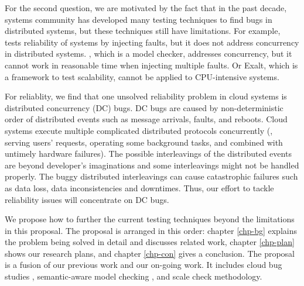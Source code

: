 For the second question, we are motivated by the fact that in the past decade,
systems community has developed many testing techniques
\cite{Gunawi+11-FateDestini, Guo+11-Demeter, Wang+14-Exalt, Yang+09-Modist} to
find bugs in distributed systems, but these techniques still have limitations.
For example, \fate\ \cite{Gunawi+11-FateDestini} tests reliability of systems by
injecting faults, but it does not address concurrency in distributed systems.
\modist, which is a model checker, addresses concurrency, but it cannot work in
reasonable time when injecting multiple faults. Or Exalt, which is a framework
to test scalability, cannot be applied to CPU-intensive systems. 

For reliablity, we find that one unsolved reliability problem in cloud systems
is distributed concurrency (DC) bugs. DC bugs are caused  by non-deterministic
order of distributed events such as message arrivals, faults, and reboots. Cloud
systems execute multiple complicated distributed protocols concurrently (\eg,
serving users' requests, operating some background tasks, and combined with
untimely hardware failures). The possible interleavings of the distributed
events are beyond developer's imaginations and some interleavings might not be
handled properly. The buggy distributed interleavings can cause catastrophic
failures such as data loss, data inconsistencies and downtimes. Thus, our effort
to tackle reliability issues will concentrate on DC bugs.

We propose how to further the current testing techniques beyond the limitations
in this proposal. The proposal is arranged in this order: chapter \ref{chp-bg}
explains the problem being solved in detail and discusses related work, chapter
\ref{chp-plan} shows our research plans, and chapter \ref{chp-con} gives a
conclusion.
%
The proposal is a fusion of our previous work and our on-going work. It includes
cloud bug studies \cite{Gunawi+14-Cbs, Leesatapornwongsa+16-TaxDC},
semantic-aware model checking \cite{Leesatapornwongsa+14-Samc}, and scale check
methodology.

